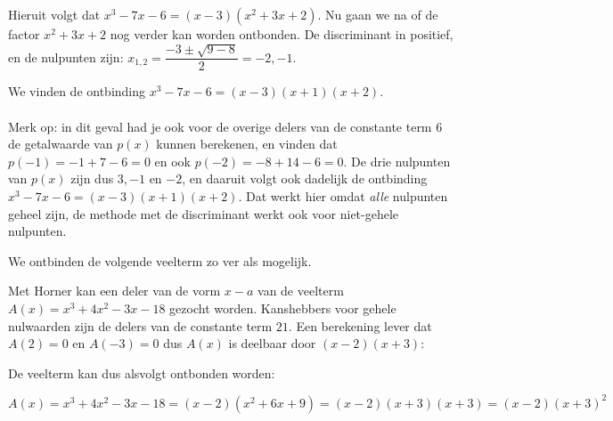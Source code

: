 \documentclass{ximera}
\begin{document}
\begin{example}
\begin{oplossing}[toon]
        Hieruit volgt dat \(x^3-7x-6 = (x-3)(x^2+3x+2)\). Nu gaan we na of de factor  \(x^2+3x+2\) nog verder kan worden ontbonden. De discriminant in positief, en de nulpunten zijn: \(x_{1,2} = \dfrac{-3\pm\sqrt{9-8}}{2} = -2,-1\).
         
        We vinden de ontbinding \(x^3-7x-6=(x-3)(x+1)(x+2)\).
        \\
        \\
        Merk op: in dit geval had je ook voor de overige delers van de constante term 6 de getalwaarde van \(p(x)\) kunnen berekenen, en vinden dat \(p(-1)=-1+7-6=0\) en ook \(p(-2)=-8+14-6=0\). De drie nulpunten van \(p(x)\) zijn dus \(3,-1\) en \(-2\), en daaruit volgt ook dadelijk de ontbinding \(x^3-7x-6=(x-3)(x+1)(x+2)\). Dat werkt hier omdat \textit{alle} nulpunten geheel zijn, de methode met de discriminant werkt ook voor niet-gehele nulpunten.
         
    \end{oplossing}
\end{example}




\begin{example} 
We ontbinden de volgende veelterm zo ver als mogelijk.
\renewcommand{\kolbreed}{\widthof{\(-18\)}}

Met Horner kan een deler van de vorm \(x-a\) van de veelterm \(A(x) = x^3 + 4x^2 - 3x - 18\) gezocht worden. Kanshebbers voor gehele nulwaarden zijn de delers van de constante term \(21\). Een berekening lever dat \( A(2) = 0 \text{ en } A(-3) = 0 \) dus \(A(x)\) is deelbaar door \((x-2)(x+3)\): 



De veelterm kan dus alsvolgt ontbonden worden: 

\[
A(x) = x^3 + 4x^2 - 3x - 18= (x-2)(x^2+6x+9) = (x-2)(x+3)(x+3) = (x-2)(x+3)^2
\]

\end{example} 
\end{document}
